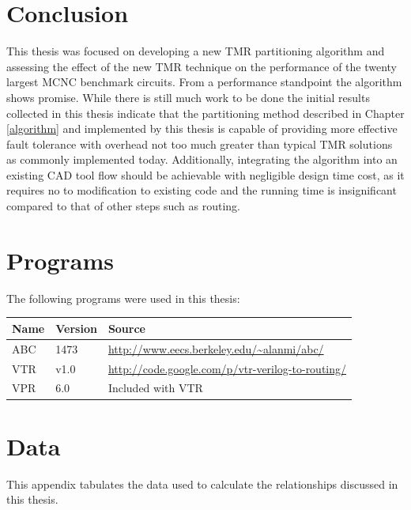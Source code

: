 \documentclass[12pt,final,oneside,a4paper]{dwThesis} %
\begin{document}
   \chapter{Conclusion}
   This thesis was focused on developing a new TMR
   partitioning algorithm and assessing the effect of the new \gls{TMR}
   technique on the performance of the twenty largest \gls{MCNC} benchmark circuits. From a performance
   standpoint the algorithm shows promise. While there is still much work to be
   done the initial results collected in this thesis indicate that the
   partitioning method described in Chapter \ref{algorithm} and implemented by this
   thesis is capable of providing more effective fault tolerance with overhead
   not too much greater than typical \gls{TMR} solutions as commonly
   implemented today. Additionally, integrating the algorithm into an existing \gls{CAD} tool flow 
   should be achievable with negligible design time cost, as it requires no to modification to existing code and
   the running time is insignificant compared to that of other steps such as routing.


   \appendix 
   \chapter{Programs}
   The following programs were used in this thesis:
      \begin{center}
         \begin{tabular}{lll}
            \toprule
            Name & Version & Source \\
            \midrule
            \gls{ABC} & 1473 & \url{http://www.eecs.berkeley.edu/~alanmi/abc/}\\
            \gls{VTR} & v1.0 & \url{http://code.google.com/p/vtr-verilog-to-routing/}\\
            \gls{VPR} & 6.0 & Included with \gls{VTR}\\
            \bottomrule

         \end{tabular}
      \end{center}
   \chapter{Data}
   This appendix tabulates the data used to
   calculate the relationships discussed in this thesis.
\end{document}
